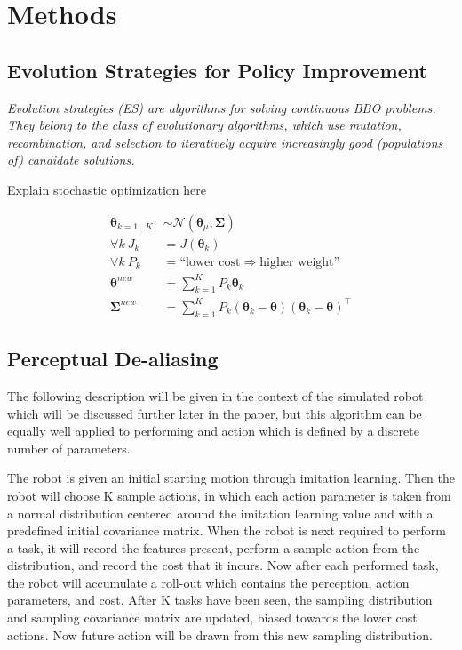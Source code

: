 \documentclass[12pt]{article}
\newcommand{\extract}[1]{{\em #1}}
\newcommand{\mymath}[1]{\ensuremath{#1}\xspace}
\newcommand{\app}    {\mymath{\bm{\theta}}}
\newcommand{\covar}  {\mymath{\bm{\Sigma}}}
\begin{document}
\section{Methods}

\subsection{Evolution Strategies for Policy Improvement}

\extract{Evolution strategies (ES) are algorithms for solving continuous BBO problems. They belong to the class of evolutionary algorithms, which use mutation, recombination, and selection to iteratively acquire increasingly good (populations of) candidate solutions.}

\color{red}Explain stochastic optimization here \color{black}


\begin{align*}
\app_{k=1\dots K} & {\sim}\mathcal{N}({\app_\mu},{\covar})\\
\forall k~J_k & = J(\app_k)\\
\forall k~P_k & = \mbox{``lower cost} \Rightarrow \mbox{higher weight''}\\
\app^{new} & = \sum_{k=1}^{K} P_k \app_k\\
\covar^{new} & = \sum_{k=1}^{K}P_k(\app_k-\app)(\app_k-\app)^\intercal
\end{align*}

\subsection{Perceptual De-aliasing}
The following description will be given in the context of the simulated robot which will be discussed further later in the paper, but this algorithm can be equally well applied to performing and action which is defined by a discrete number of parameters. 

The robot is given an initial starting motion through imitation learning. Then the robot will choose K sample actions, in which each action parameter is taken from a normal distribution centered around the imitation learning value and with a predefined initial covariance matrix. When the robot is next required to perform a task, it will record the features present, perform a sample action from the distribution, and record the cost that it incurs. Now after each performed task, the robot will accumulate a roll-out which contains the perception, action parameters, and cost. After K tasks have been seen, the sampling distribution and sampling covariance matrix are updated, biased towards the lower cost actions. Now future action will be drawn from this new sampling distribution. 
\end{document}
